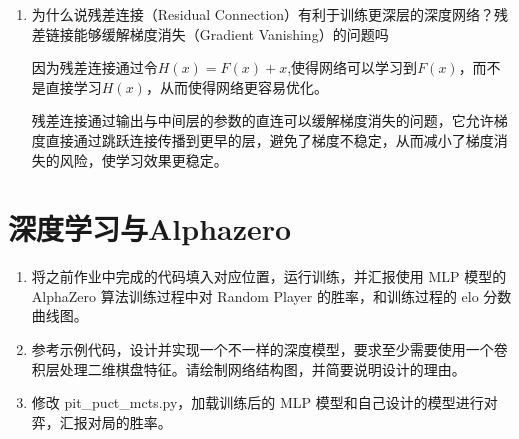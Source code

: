 \documentclass[a4paper,9pt]{article}
\begin{document}
\begin{enumerate}
    \item 为什么说残差连接（Residual Connection）有利于训练更深层的深度网络？残差链接能够缓解梯度消失（Gradient Vanishing）的问题吗
    
    因为残差连接通过令$H(x)=F(x)+x$,使得网络可以学习到$F(x)$，而不是直接学习$H(x)$，从而使得网络更容易优化。
    
    残差连接通过输出与中间层的参数的直连可以缓解梯度消失的问题，它允许梯度直接通过跳跃连接传播到更早的层，避免了梯度不稳定，从而减小了梯度消失的风险，使学习效果更稳定。

\end{enumerate}


\section{深度学习与Alphazero}

\begin{enumerate}
    \item 将之前作业中完成的代码填入对应位置，运行训练，并汇报使用 MLP 模型的 AlphaZero 算法训练过程中对 Random Player 的胜率，和训练过程的 elo 分数曲线图。
    \item 参考示例代码，设计并实现一个不一样的深度模型，要求至少需要使用一个卷积层处理二维棋盘特征。请绘制网络结构图，并简要说明设计的理由。
    \item 修改 pit_puct_mcts.py，加载训练后的 MLP 模型和自己设计的模型进行对弈，汇报对局的胜率。
\end{enumerate}
\end{document}
